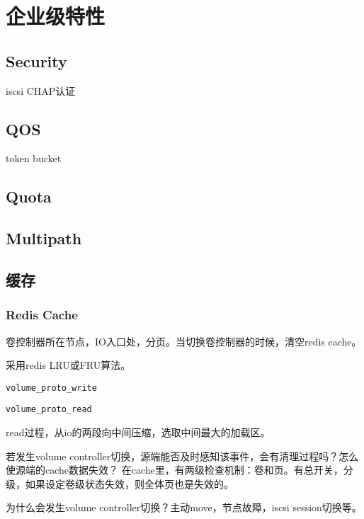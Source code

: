 \chapter{企业级特性}

\section{Security}

iscsi CHAP认证

\section{QOS}

token bucket



\section{Quota}

\section{Multipath}

\section{缓存}

\subsection{Redis Cache}

卷控制器所在节点，IO入口处，分页。当切换卷控制器的时候，清空redis cache。

采用redis LRU或FRU算法。

\begin{compactitem}
    \item \verb|volume_proto_write|
    \item \verb|volume_proto_read|
\end{compactitem}

read过程，从io的两段向中间压缩，选取中间最大的加载区。

若发生volume controller切换，源端能否及时感知该事件，会有清理过程吗？怎么使源端的cache数据失效？
在cache里，有两级检查机制：卷和页。有总开关，分级，如果设定卷级状态失效，则全体页也是失效的。

为什么会发生volume controller切换？主动move，节点故障，iscsi session切换等。

